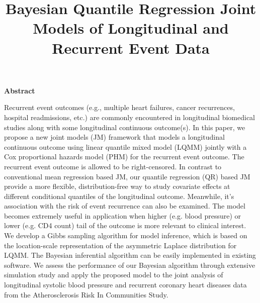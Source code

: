 \title{Bayesian Quantile Regression Joint Models of Longitudinal and Recurrent Event Data}

\author{}
\date{}

\maketitle


\begin{center}
{\bf Abstract}
\end{center}

Recurrent event outcomes (e.g., multiple heart failures, cancer recurrences, hospital readmissions, etc.) are commonly encountered in longitudinal biomedical studies along with some longitudinal continuous outcome(s). In this paper, we propose a new joint models (JM) framework that models a longitudinal continuous outcome using linear quantile mixed model (LQMM) jointly with a Cox proportional hazards model (PHM) for the recurrent event outcome. The recurrent event outcome is allowed to be right-censored. In contrast to conventional mean regression based JM, our quantile regression (QR) based JM provide a more flexible, distribution-free way to study covariate effects at different conditional quantiles of the longitudinal outcome. Meanwhile, it's association with the risk of event recurrence can also be examined. The model becomes extremely useful in application when higher (e.g. blood pressure) or lower (e.g. CD4 count) tail of the outcome is more relevant to clinical interest. We develop a Gibbs sampling algorithm for model inference, which is based on the location-scale representation of the asymmetric Laplace distribution for LQMM. The Bayesian inferential algorithm can be easily implemented in existing software. We assess the performance of our Bayesian algorithm through extensive simulation study and apply the proposed model to the joint analysis of longitudinal systolic blood pressure and recurrent coronary heart diseases data from the Atherosclerosis Risk In Communities Study.

